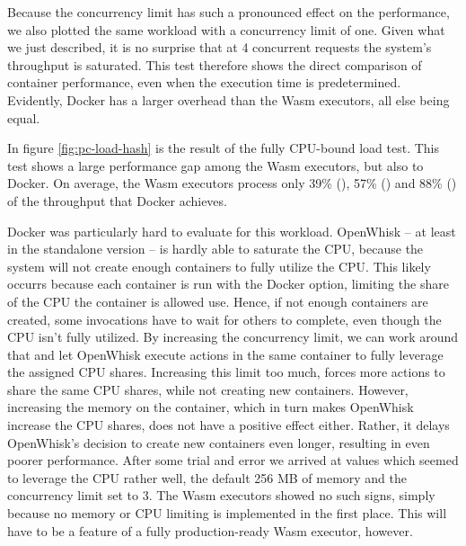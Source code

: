 Because the concurrency limit has such a pronounced effect on the performance, we also plotted the same workload with a concurrency limit of one. Given what we just described, it is no surprise that at 4 concurrent requests the system's throughput is saturated. This test therefore shows the direct comparison of container performance, even when the execution time is predetermined. Evidently, Docker has a larger overhead than the Wasm executors, all else being equal.


In figure \ref{fig:pc-load-hash} is the result of the fully CPU-bound load test. This test shows a large performance gap among the Wasm executors, but also to Docker. On average, the Wasm executors process only 39\% (), 57\% () and 88\% () of the throughput that Docker achieves.

Docker was particularly hard to evaluate for this workload. OpenWhisk -- at least in the standalone version -- is hardly able to saturate the CPU, because the system will not create enough containers to fully utilize the CPU.
This likely occurrs because each container is run with the  Docker option, limiting the share of the CPU the container is allowed use. Hence, if not enough containers are created, some invocations have to wait for others to complete, even though the CPU isn't fully utilized.
By increasing the concurrency limit, we can work around that and let OpenWhisk execute actions in the same container to fully leverage the assigned CPU shares. Increasing this limit too much, forces more actions to share the same CPU shares, while not creating new containers.
However, increasing the memory on the container, which in turn makes OpenWhisk increase the CPU shares, does not have a positive effect either. Rather, it delays OpenWhisk's decision to create new containers even longer, resulting in even poorer performance. After some trial and error we arrived at values which seemed to leverage the CPU rather well, the default 256 MB of memory and the concurrency limit set to 3.
The Wasm executors showed no such signs, simply because no memory or CPU limiting is implemented in the first place. This will have to be a feature of a fully production-ready Wasm executor, however.

